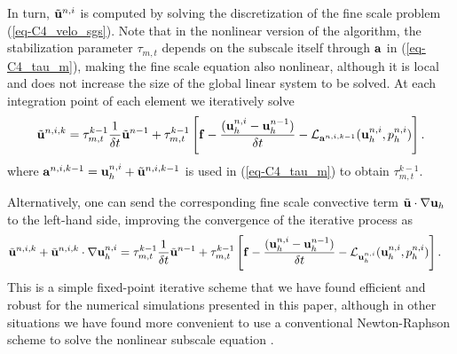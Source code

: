 In turn, $\tilde{{\bf u}}^{n,i}$ is computed by solving the discretization of the fine scale problem (\ref{eq-C4_velo_sgs}). Note that in the nonlinear version of the algorithm, the stabilization parameter $\tau_{m,t}$ depends on the subscale itself through ${\bf a}$ in (\ref{eq-C4_tau_m}), making the fine scale equation also nonlinear, although it is local and does not increase the size of the global linear system to be solved. At each integration point of each element we iteratively solve
\begin{equation}
\label{eq-C4_velo_sgs_discrete_expl}
\tilde{\mathbf{u}}^{n,i,k}=\tau_{m,t}^{k-1}\frac{1}{\delta t}\tilde{\mathbf{u}}^{n-1}
+ \tau_{m,t}^{k-1} \left[\mathbf{f} - \frac{({\bf u}_h^{n,i}-{\bf u}_h^{n-1})}{\delta t} - \mathcal{L}_{{\bf a}^{n,i,k-1}}({\bf u}_h^{n,i},p_h^{n,i})\right].
\end{equation}
where ${\bf a}^{n,i,k-1}={\bf u}_h^{n,i}+\tilde{{\bf u}}^{n,i,k-1}$  is used in (\ref{eq-C4_tau_m}) to obtain $\tau_{m,t}^{k-1}$. 

 Alternatively, one can send the corresponding fine scale convective term $\tilde{{\bf u}}\cdot\nabla{\bf u}_h$ to the left-hand side, improving the convergence of the iterative process as
\begin{align}
\label{eq-C4_velo_sgs_discrete_impl}
\tilde{\mathbf{u}}^{n,i,k}
& + \tilde{{\bf u}}^{n,i,k}\cdot\nabla{\bf u}_h^{n,i}
  = \tau_{m,t}^{k-1} \frac{1}{\delta t} \tilde{\mathbf{u}}^{n-1} + \tau_{m,t}^{k-1} \left[\mathbf{f} - \frac{({\bf u}_h^{n,i}-{\bf u}_h^{n-1})}{\delta t} - \mathcal{L}_{{\bf u}_h^{n,i}}({\bf u}_h^{n,i},p_h^{n,i})\right].
\end{align}
This is a simple fixed-point iterative scheme that we have found efficient and robust for the numerical simulations presented in this paper, although in other situations we have found more convenient to use a conventional Newton-Raphson scheme to solve the nonlinear subscale equation \cite{Avila2011}.

